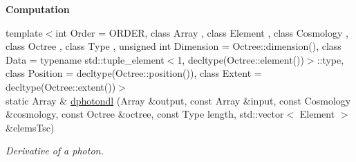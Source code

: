 \begin{Indent}{\bf Computation}\par
\begin{DoxyCompactItemize}
\item 
{\footnotesize template$<$int Order = O\-R\-D\-E\-R, class Array , class Element , class Cosmology , class Octree , class Type , unsigned int Dimension = Octree\-::dimension(), class Data  = typename std\-::tuple\-\_\-element$<$1, decltype(\-Octree\-::element())$>$\-::type, class Position  = decltype(\-Octree\-::position()), class Extent  = decltype(\-Octree\-::extent())$>$ }\\static Array \& \hyperlink{exceptionIntegrator_af8786b67385276132bc97a953a48939e}{dphotondl} (Array \&output, const Array \&input, const Cosmology \&cosmology, const Octree \&octree, const Type length, std\-::vector$<$ Element $>$ \&elems\-Tsc)
\begin{DoxyCompactList}\small\item\em Derivative of a photon. \end{DoxyCompactList}\end{DoxyCompactItemize}
\end{Indent}
